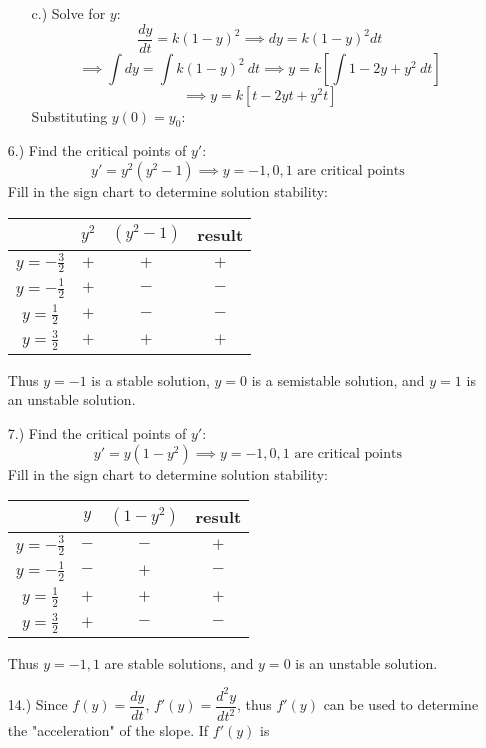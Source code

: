 \documentclass[12pt]{article}
\newcommand{\bracks}[1]{\left[#1\right]}
\begin{document}
\begin{itemize}
\begin{itemize}
        \item [c.)] Solve for $y$:
        \[\frac{dy}{dt}=k(1-y)^2\implies dy=k(1-y)^2dt\]
        \[\implies\int dy=\int k(1-y)^2\ dt\implies y=k\bracks{\int1-2y+y^2\ dt}\]
        \[\implies y=k\bracks{t-2yt+y^2t}\]
        Substituting $y(0)=y_0$:
    \end{itemize}

    \pagebreak
    \item [6.)] Find the critical points of $y'$:
    \[y'=y^2(y^2-1)\implies y=-1,0,1\text{ are critical points}\]
    Fill in the sign chart to determine solution stability:
    \begin{center}
        \begin{tabular}{c|c|c|c}
            & $y^2$ & $(y^2-1)$ & result\\
            \hline
            $y=-\frac{3}{2}$ & $+$ & $+$ & $+$\\
            $y=-\frac{1}{2}$ & $+$ & $-$ & $-$\\
            $y=\frac{1}{2}$ & $+$ & $-$ & $-$\\
            $y=\frac{3}{2}$ & $+$ & $+$ & $+$\\
        \end{tabular}
    \end{center}
    Thus $y=-1$ is a stable solution, $y=0$ is a semistable solution, and $y=1$ is an unstable solution.

    \item [7.)] Find the critical points of $y'$:
    \[y'=y(1-y^2)\implies y=-1,0,1\text{ are critical points}\]
    Fill in the sign chart to determine solution stability:
    \begin{center}
        \begin{tabular}{c|c|c|c}
            & $y$ & $(1-y^2)$ & result\\
            \hline
            $y=-\frac{3}{2}$ & $-$ & $-$ & $+$\\
            $y=-\frac{1}{2}$ & $-$ & $+$ & $-$\\
            $y=\frac{1}{2}$ & $+$ & $+$ & $+$\\
            $y=\frac{3}{2}$ & $+$ & $-$ & $-$\\
        \end{tabular}
    \end{center}
    Thus $y=-1,1$ are stable solutions, and $y=0$ is an unstable solution.

    \item [14.)] Since $f(y)=\dfrac{dy}{dt}$, $f'(y)=\dfrac{d^2y}{dt^2}$, thus $f'(y)$ can be used to determine the "acceleration" of the slope. If $f'(y)$ is

\end{itemize}
\end{document}
